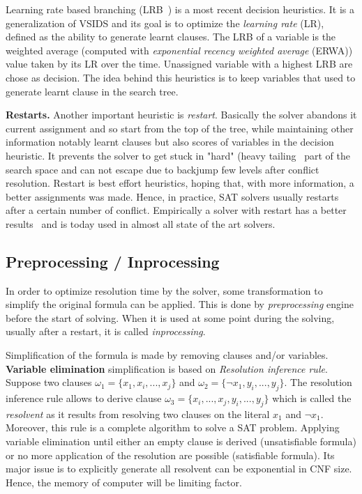 Learning rate based branching (LRB~\cite{liang2016learning}) is a most recent decision heuristics. It is a
generalization of VSIDS and its goal is to optimize the \emph{learning rate} (LR), defined as the ability to generate
learnt clauses. The LRB of a variable is the weighted average (computed with \emph{exponential recency
weighted average} (ERWA))  value taken by its LR over the time. Unassigned variable with a highest LRB are chose as decision. The idea behind this heuristics is to keep variables that used to generate learnt clause in the search tree.


\textbf{Restarts.}
Another important heuristic is \emph{restart}. Basically the solver abandons it current assignment and so 
start from the top of the tree, while maintaining other information notably learnt clauses but also scores of variables in the decision heuristic. It prevents the solver to get stuck in "hard" (heavy tailing~\cite{gomes1997heavy} part of the search space and can not escape due to backjump few levels after conflict resolution. Restart is best effort heuristics, hoping that,
with more information, a better assignments was made. Hence, in practice, SAT solvers usually restarts after a
certain number of conflict. Empirically a solver with restart has a better results~\cite{huang2007effect} and is today
used in almost all state of the art solvers.


\subsection{Preprocessing / Inprocessing}

In order to optimize resolution time by the solver, some transformation to simplify the original formula can be applied. This is done by \emph{preprocessing} engine before the start of solving. When it is used at some point during the solving, usually after a restart, it is called \emph{inprocessing}.

Simplification of the formula is made by removing clauses and/or variables.\\
\textbf{Variable elimination} simplification is based on \emph{Resolution inference rule}.
Suppose two clauses	$\omega_1 = \{x_1, x_i, ..., x_j \}$ and $\omega_2 = \{\neg x_1, y_i, ..., y_j\}$.
The resolution inference rule allows to derive clause $\omega_3 = \{x_i, ..., x_j, y_i, ..., y_j\}$ which is called
the \emph{resolvent} as it results from resolving two clauses on the literal $x_1$ and $\neg x_1$.
Moreover, this rule is a complete algorithm to solve a SAT problem. Applying variable elimination until either an empty clause is derived (unsatisfiable formula) or no more application of the resolution are
possible (satisfiable formula). Its major issue is to explicitly generate all resolvent can be exponential in CNF size. Hence, the memory of computer will be limiting factor.


